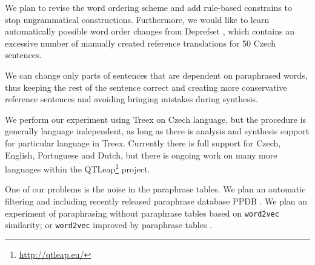 \documentclass[11pt]{article}
\def\footurl#1{\footnote{\url{#1}}}
\begin{document}
We plan to revise the word ordering scheme and add rule-based constrains to 
stop ungrammatical constructions. Furthermore, we would like to learn 
automatically possible word order changes from Deprefset \cite{bojar-scratching}, 
which contains an excessive number of manually created reference translations 
for 50 Czech sentences.

We can change only parts of sentences that are dependent on 
paraphrased words, thus keeping the rest of the sentence correct and 
creating more conservative reference sentences and avoiding bringing
mistakes during synthesis.

We perform our experiment using Treex on Czech language, but the procedure is 
generally language independent, as long as there is analysis and synthesis 
support for particular language in Treex. Currently there is full support for 
Czech, English, Portuguese and Dutch, but there is ongoing work on many more 
languages within the QTLeap\footurl{http://qtleap.eu/} project.

One of our problems is the noise in the paraphrase tables. We plan an automatic
filtering and including recently released paraphrase database PPDB \cite{ppdb}.
We plan an experiment of paraphrasing without paraphrase tables based on
\verb!word2vec! \cite{word2vec} similarity; or \verb!word2vec! improved by 
paraphrase tables \cite{Faruqui:Retrofitting}.



\end{document}
